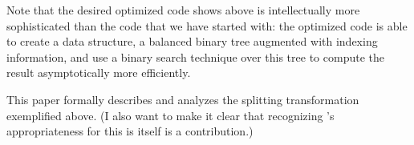 Note that the desired optimized code shows above is intellectually more
sophisticated than the code that we have started with: the optimized code is
able to create a data structure, a balanced binary tree augmented with indexing
information, and use a binary search technique over this tree to compute the
result asymptotically more efficiently.

This paper formally describes and analyzes the splitting transformation
exemplified above.  (I also want to make it clear that recognizing \lang's
appropriateness for this is itself is a contribution.)


